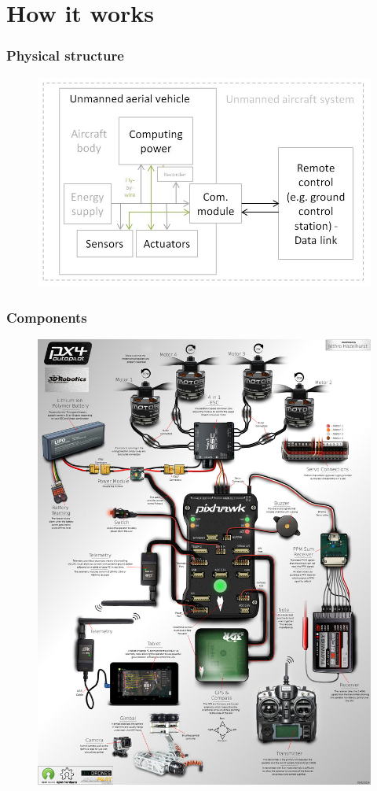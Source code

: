 \section{How it works}

\begin{frame}

\frametitle{Physical structure}
\begin{figure}[H]
  \begin{center}
  \includegraphics[scale=0.45]{fig/uav_hardware.jpg}
  \end{center}
\end{figure}

\end{frame}



\begin{frame}

\frametitle{Components}
\begin{figure}[H]
  \begin{center}
  \includegraphics[scale=0.12]{fig/all_devices.jpg}
  \end{center}
\end{figure}

\end{frame}
